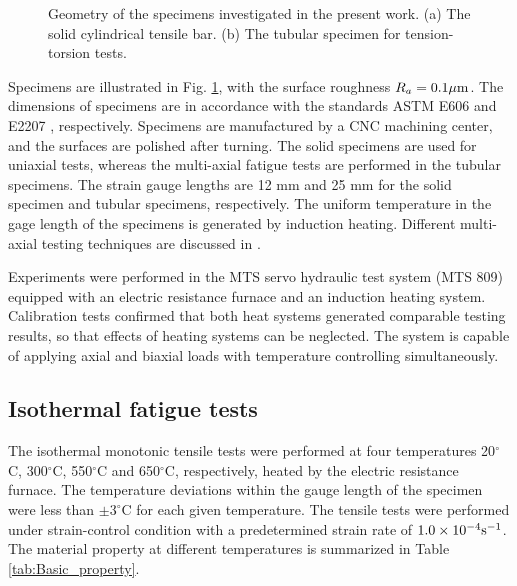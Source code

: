 \documentclass[preprint,5p,twocolumn,11pt,sort&compress]{elsarticle}
\begin{document}
\begin{figure}
\caption{Geometry of the specimens investigated in the present work. (a) The solid cylindrical tensile bar. (b) The tubular specimen for tension-torsion tests.}
\label{Fig:Specimen}
\end{figure}

Specimens are illustrated in Fig. \ref{Fig:Specimen}, with the surface roughness  $R_a=0.1\rm{\mu m}$. The dimensions of specimens are in accordance with the standards ASTM E606 \cite{astm2012606} and E2207 \cite{standard2007e2207}, respectively. Specimens are manufactured by a CNC machining center, and the surfaces are polished after turning. The solid specimens are used for uniaxial tests, whereas the multi-axial fatigue tests are performed in the tubular specimens. The strain gauge lengths are 12 mm and 25 mm for the solid specimen and tubular specimens, respectively. The uniform temperature in the gage length of the specimens is generated by induction heating. Different multi-axial testing techniques are discussed in \cite{socie2000multiaxial}.

Experiments were performed in the MTS servo hydraulic test system (MTS 809) equipped with an electric resistance furnace and an induction heating system. Calibration tests confirmed that both heat systems generated comparable testing results, so that effects of heating systems can be neglected. The system is capable of applying axial and biaxial loads with temperature controlling simultaneously.

\subsection{Isothermal fatigue tests}
\noindent
The isothermal monotonic tensile tests were performed at four temperatures 20$^{\circ}$C, 300$^{\circ}$C, 550$^{\circ}$C and 650$^{\circ}$C, respectively, heated by the electric resistance furnace. The temperature deviations within the gauge length of the specimen were less than $\pm3^{\circ}$C for each given temperature. The tensile tests were performed under strain-control condition with a predetermined strain rate of $1.0\times 10^{-4}\rm{s}^{-1}$.
The material property at different temperatures is summarized in Table \ref{tab:Basic_property}.
\end{document}
